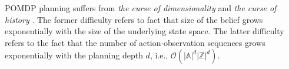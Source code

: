 \documentclass[letterpaper]{article} %
\begin{document}
\noindent
POMDP planning suffers from \textit{the curse of dimensionality} \cite{KLC98} and \textit{the curse of history} \cite{Pineau03}. The former difficulty refers to fact that size of the belief grows exponentially with the size of the underlying state space. The latter difficulty refers to the fact that the number of action-observation sequences grows exponentially with the planning depth $d$, i.e., $\mathcal{O}(|\mathbb{A}|^d|\mathbb{Z}|^d)$.
\end{document}
